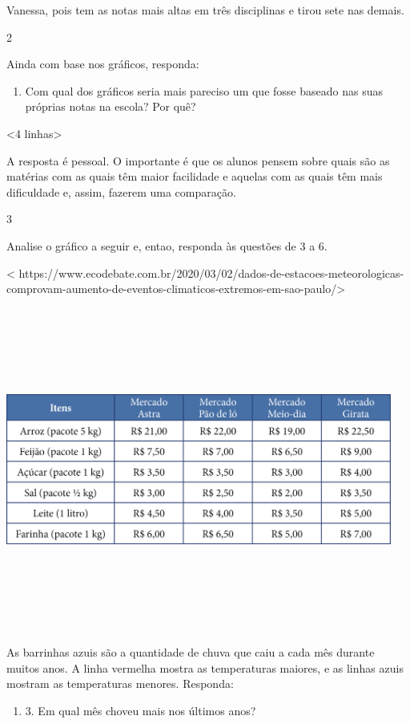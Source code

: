 {{{{{{{{{{{{{{{{{Vanessa, pois tem as notas mais altas em três disciplinas e tirou sete nas demais.

\num{2}

Ainda com base nos gráficos, responda:

\begin{enumerate}
\def\labelenumi{\alph{enumi})}
\item
  Com qual dos gráficos seria mais pareciso um que fosse baseado nas suas próprias notas na escola? Por quê?
\end{enumerate}

\textless{}4 linhas\textgreater{}

A resposta é pessoal. O importante é que os alunos pensem sobre quais são as matérias com as quais têm maior facilidade e aquelas com as quais têm mais dificuldade e, assim, fazerem uma comparação.

\num{3}

Analise o gráfico a seguir e, entao, responda às questões de 3 a 6.

\textless{}
https://www.ecodebate.com.br/2020/03/02/dados-de-estacoes-meteorologicas-comprovam-aumento-de-eventos-climaticos-extremos-em-sao-paulo/\textgreater{}

\includegraphics[width=5.00000in,height=4.17708in]{media/image92.png}

As barrinhas azuis são a quantidade de chuva que caiu a cada mês durante
muitos anos. A linha vermelha mostra as temperaturas maiores, e as
linhas azuis mostram as temperaturas menores. Responda:

\begin{enumerate}
\def\labelenumi{\alph{enumi})}
\item
3. Em qual mês choveu mais nos últimos anos?
\end{enumerate}

}}}}}}}}}}}}}}}}}
